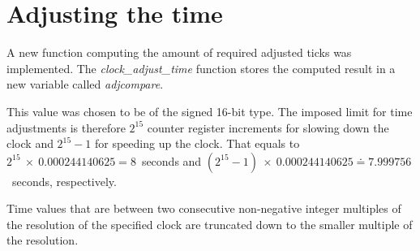 \section{Adjusting the time}
A new function computing the amount of required adjusted ticks was implemented.
The {\it{clock\_adjust\_time}} function stores the computed result in
a new variable called {\it{adjcompare}}.

This value was chosen to be of the signed 16-bit type.
The imposed limit for time adjustments is therefore $2^{15}$ counter register increments
for slowing down the clock and $2^{15}-1$ for speeding up the clock.
That equals to $2^{15}~\times~0.000244140625 = 8$~seconds
and $(2^{15} - 1)~\times~0.000244140625 \doteq 7.999756$~seconds, respectively.


Time values that are between two consecutive non-negative integer multiples
of the resolution of the specified clock are truncated down to the smaller multiple of the resolution.





